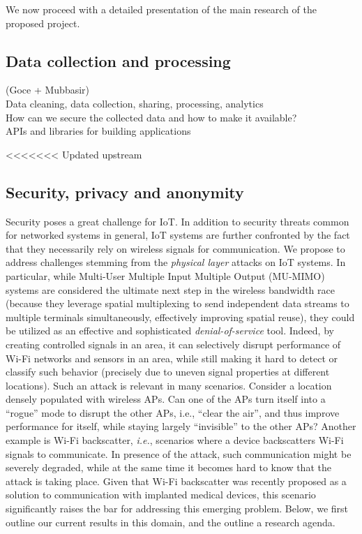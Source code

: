 We now proceed with a detailed presentation of the main research of the proposed project. 


\subsection{Data collection and processing} 
(Goce + Mubbasir)\\
Data cleaning, data collection, sharing, processing, analytics\\
How can we secure the collected data and how to make it available?\\
APIs and libraries for building applications 

<<<<<<< Updated upstream

 



\subsection{Security, privacy and anonymity}



Security poses a great challenge for IoT. In addition to security threats common for networked systems in general, IoT systems are further confronted by the fact that they necessarily rely on wireless signals for communication. We propose to address challenges stemming from the \emph{physical layer} attacks on IoT systems. In particular, while Multi-User Multiple Input Multiple Output (MU-MIMO) systems are considered the ultimate next step in the wireless bandwidth race (because they leverage spatial multiplexing to send independent data streams to multiple terminals simultaneously, effectively improving spatial reuse), they could be utilized as an effective and sophisticated \emph{denial-of-service} tool. Indeed, by creating controlled signals in an area, it can selectively disrupt performance of Wi-Fi networks and sensors in an area, while still making it hard to detect or classify such behavior (precisely due to uneven signal properties at different locations). Such an attack is relevant in many scenarios. Consider a location densely populated with wireless APs. Can one of the APs turn itself into a “rogue” mode to disrupt the other APs, i.e., “clear the air”, and thus improve performance for itself, while staying largely “invisible” to the other APs? Another example is Wi-Fi backscatter, \emph{i.e.}, scenarios where a device backscatters Wi-Fi signals to communicate. In presence of the attack, such communication might be severely degraded, while at the same time it becomes hard to know that the attack is taking place. Given that Wi-Fi backscatter was recently proposed as a solution to communication with implanted medical devices, this scenario significantly raises the bar for addressing this emerging problem. Below, we first outline our current results in this domain, and the outline a research agenda. 


